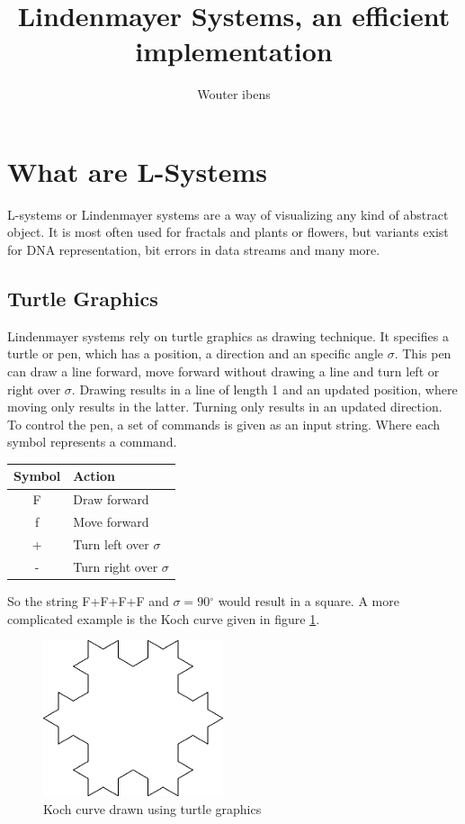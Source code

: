 \documentclass[11pt,a4paper]{article}
\author{Wouter ibens}
\title{Lindenmayer Systems, an efficient implementation}
\newcommand{\degree}{\ensuremath{^\circ}}
\begin{document}
\maketitle
\tableofcontents
\newpage
\section{What are L-Systems}
L-systems or Lindenmayer systems are a way of visualizing any kind of abstract object. It is most often used for fractals and plants or flowers, but variants exist for DNA representation, bit errors in data streams and many more.

\subsection{Turtle Graphics}
Lindenmayer systems rely on turtle graphics as drawing technique. It specifies a turtle or pen, which has a position, a direction and an specific angle $\sigma$. This pen can draw a line forward, move forward without drawing a line and turn left or right over $\sigma$. Drawing results in a line of length 1 and an updated position, where moving only results in the latter. Turning only results in an updated direction.
To control the pen, a set of commands is given as an input string. Where each symbol represents a command.
\begin{center}
\begin{tabular}{c | l}
Symbol & Action \\ \hline
F & Draw forward \\
f & Move forward \\
+ & Turn left over $\sigma$ \\
- & Turn right over $\sigma$
\end{tabular}
\end{center}

So the string F+F+F+F and $\sigma = 90\degree$ would result in a square. A more complicated example is the Koch curve given in figure \ref{fig:koch}.
\begin{figure}[h!]
  \centering
  \includegraphics[]{koch.png}
  \caption{Koch curve drawn using turtle graphics}
  \label{fig:koch}
\end{figure}
\end{document}
